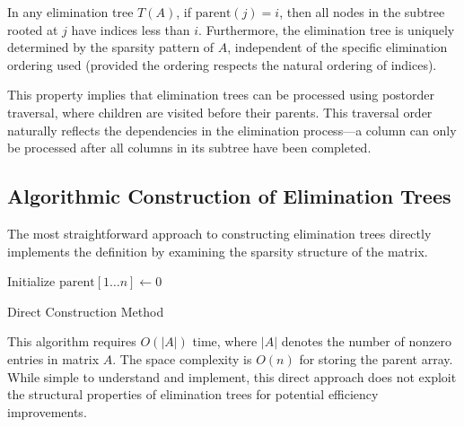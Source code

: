 \begin{theorem}
In any elimination tree $T(A)$, if $\text{parent}(j) = i$, then all nodes in the subtree rooted at $j$ have indices less than $i$. Furthermore, the elimination tree is uniquely determined by the sparsity pattern of $A$, independent of the specific elimination ordering used (provided the ordering respects the natural ordering of indices).
\end{theorem}

This property implies that elimination trees can be processed using postorder traversal, where children are visited before their parents. This traversal order naturally reflects the dependencies in the elimination process—a column can only be processed after all columns in its subtree have been completed.

\subsection{Algorithmic Construction of Elimination Trees}

The most straightforward approach to constructing elimination trees directly implements the definition by examining the sparsity structure of the matrix.

\begin{algorithm}
\BlankLine
Initialize $\text{parent}[1 \ldots n] \leftarrow 0$ 
\caption{Direct Construction Method}
\label{alg:direct_elimination_tree}
\end{algorithm}

This algorithm requires $O(|A|)$ time, where $|A|$ denotes the number of nonzero entries in matrix $A$. The space complexity is $O(n)$ for storing the parent array. While simple to understand and implement, this direct approach does not exploit the structural properties of elimination trees for potential efficiency improvements.


